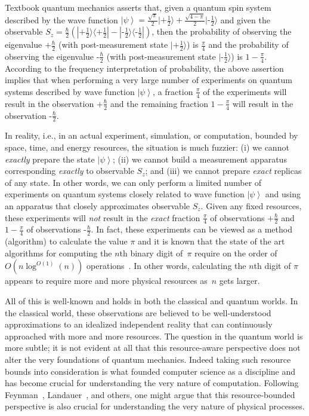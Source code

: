 \documentclass[reprint, aps, prl,superscriptaddress, showpacs,
showkeys]{revtex4-1}
\theoremstyle{plain}
\theoremstyle{definition}
\newcommand{\ket}[1]{{\left\vert{#1}\right\rangle}}
\newcommand{\fket}[1]{{|#1\rangle}}
\newcommand{\fproj}[1]{|#1\rangle\langle #1|}
\newcommand{\ps}{\texttt{+}}
\newcommand{\minus}{\texttt{-}}
\begin{document}
Textbook quantum mechanics asserts that, given a quantum spin system
described by the wave function
$\ket{\psi}=\frac{\sqrt{\pi}}{2}\fket{\ps\frac{1}{2}}+\frac{\sqrt{4-\pi}}{2}\fket{\minus\frac{1}{2}}$
and given the observable
$S_z =
\frac{\hbar}{2}(\fproj{\ps\frac{1}{2}}-\fproj{\minus\frac{1}{2}})$,
then the probability of observing the eigenvalue $\ps\frac{\hbar}{2}$
(with post-measurement state $\fket{\ps\frac{1}{2}}$) is
$\frac{\pi}{4}$ and the probability of observing the eigenvalue
$\minus\frac{\hbar}{2}$ (with post-measurement state
$\fket{\minus\frac{1}{2}}$) is $1-\frac{\pi}{4}$. According to the
frequency interpretation of probability, the above assertion implies
that when performing a very large number of experiments on quantum
systems described by wave function $\ket{\psi}$, a fraction
$\frac{\pi}{4}$ of the experiments will result in the observation
$\ps\frac{\hbar}{2}$ and the remaining fraction $1-\frac{\pi}{4}$ will
result in the observation $\minus\frac{\hbar}{2}$.

In reality, i.e., in an actual experiment, simulation, or computation,
bounded by space, time, and energy resources, the situation is much
fuzzier: (i) we cannot \emph{exactly} prepare the state $\ket{\psi}$;
(ii) we cannot build a measurement apparatus corresponding
\emph{exactly} to observable $S_z$; and (iii) we cannot prepare
\emph{exact} replicas of any state. In other words, we can only
perform a limited number of experiments on quantum systems closely
related to wave function $\ket{\psi}$ and using an apparatus that
closely approximates observable $S_z$. Given any fixed resources,
these experiments will \emph{not} result in the \emph{exact} fraction
$\frac{\pi}{4}$ of observations $\ps\frac{\hbar}{2}$ and
$1-\frac{\pi}{4}$ of observations $\minus\frac{\hbar}{2}$. In fact,
these experiments can be viewed as a method (algorithm) to calculate
the value $\pi$ and it is known that the state of the art algorithms
for computing the $n$th binary digit of~$\pi$ require on the order of
$O\left(n\log^{O\left(1\right)}\left(n\right)\right)$
operations~\cite{journals/moc/BaileyBP97}. In other words, calculating
the $n$th digit of $\pi$ appears to require more and more physical
resources as~$n$ gets larger.

All of this is well-known and holds in both the classical and quantum
worlds. In the classical world, these observations are believed to be
well-understood approximations to an idealized independent reality
that can continuously approached with more and more resources. The
question in the quantum world is more subtle; it is not evident at all
that this resource-aware perspective does not alter the very
foundations of quantum mechanics. Indeed taking such resource bounds
into consideration is what founded computer science as a discipline
and has become crucial for understanding the very nature of
computation. Following Feynman~\cite{Feynman1982Simulating},
Landauer~\cite{Landauer1996188}, and others, one might argue that this
resource-bounded perspective is also crucial for understanding the
very nature of physical processes.
\end{document}
